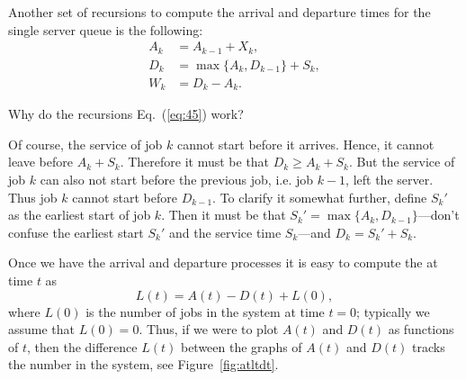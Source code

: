 Another set of recursions to compute the arrival and departure times for the single server queue is the following:
\begin{equation}
  \label{eq:45}
  \begin{split}
    A_k &= A_{k-1} + X_k, \\
    D_k &= \max\{A_k, D_{k-1}\} + S_k,\\
    W_k &= D_k - A_k.
  \end{split}
\end{equation}

\begin{exercise}  Why do the recursions Eq.~(\ref{eq:45}) work? 
  \begin{solution}
 Of course, the service of job $k$ cannot start before it
      arrives. Hence, it cannot leave before $A_k + S_k$. Therefore it
      must be that $D_k \geq A_k +S_k$. But the service of job $k$ can
      also not start before the previous job, i.e. job $k-1$, left the
      server. Thus job $k$ cannot start before $D_{k-1}$. To clarify
      it somewhat further, define $S_k'$ as the earliest start of job
      $k$. Then it must be that $S_k' = \max\{A_k, D_{k-1}\}$---don't
      confuse the earliest start $S_k'$ and the service time
      $S_k$---and $D_k = S_k' + S_k$.
    \end{solution}
\end{exercise}

Once we have the arrival and departure processes it is easy to compute
the  at time $t$ as
\begin{equation}\label{eq:14}
  L(t) = A(t) - D(t) + L(0),
\end{equation}
where $L(0)$ is the number of jobs in the system at time $t=0$;
typically we assume that $L(0)=0$. Thus, if we were to plot $A(t)$ and
$D(t)$ as functions of $t$, then the difference $L(t)$ between the
graphs of $A(t)$ and $D(t)$ tracks the number in the system, see
Figure~\ref{fig:atltdt}. 



